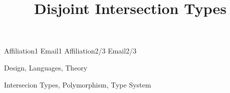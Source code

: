 \documentclass[9pt]{sigplanconf}
\begin{document}


\preprintfooter{\name}                        %

\title{Disjoint Intersection Types} 

           {Affiliation1}
           {Email1}
           {Affiliation2/3}
           {Email2/3}

\maketitle

\begin{abstract}
  
\end{abstract}


\terms Design, Languages, Theory

\keywords Intersecion Types, Polymorphism, Type System










\newpage



%
%
%
\end{document}
